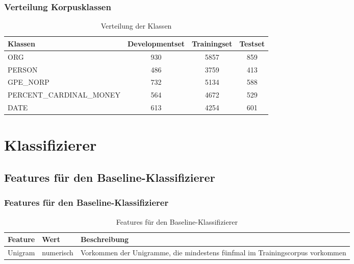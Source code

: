 \documentclass{beamer}
\begin{document}
	\begin{frame}
			\frametitle{Verteilung Korpusklassen}
			 \begin{table}
			 	\caption{Verteilung der Klassen}
			 	\begin{tabular}{lccc}
			 		\toprule
			 		Klassen  & Developmentset & Trainingset & Testset \\
			 		\midrule
			 		ORG  & 930 & 5857 & 859 \\
			 		PERSON & 486 & 3759 & 413 \\
			 		GPE\_NORP & 732 & 5134 & 588 \\
			 		PERCENT\_CARDINAL\_MONEY & 564 & 4672 & 529 \\
			 		DATE & 613 & 4254 & 601 \\
			 		\bottomrule
			 	\end{tabular}
			 	\label{tab:datasets}
			 \end{table}
	\end{frame}


\section{Klassifizierer}
	\subsection{Features für den Baseline-Klassifizierer}
	\begin{frame}
		\frametitle{Features für den Baseline-Klassifizierer}
					 \begin{table}
					 	\caption{Features für den Baseline-Klassifizierer}
					 	\begin{tabularx}{\textwidth}{llX}
					 		\toprule
							Feature & Wert & Beschreibung\\
					 		\midrule
					 		Unigram & numerisch & Vorkommen der Unigramme, die mindestens fünfmal im Trainingscorpus vorkommen \\
					 		\bottomrule
					 	\end{tabularx}
					 	\label{tab:baselinef}
					 \end{table}
	\end{frame}
\end{document}
